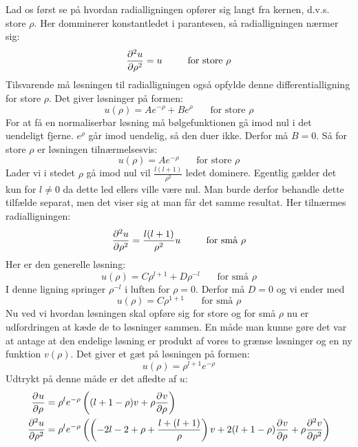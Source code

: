 \documentclass[../../Atom-ogMolekylefysik.tex]{subfiles}
\begin{document}
Lad os først se på hvordan radialligningen opfører sig langt fra kernen, d.v.s. store $\rho$. Her domminerer konstantledet i parantesen, så radialligningen nærmer sig:
\begin{equation}
    \pdif[2]{\rho}{u}=u~~~~~~~~\text{for store $\rho$}
\end{equation}
Tilsvarende må løsningen til radialligningen også opfylde denne differentialligning for store $\rho$. Det giver løsninger på formen:
\begin{equation}
    u(\rho) = Ae^{-\rho}+B e^\rho~~~~~~~~\text{for store $\rho$}
\end{equation}
For at få en normaliserbar løsning må bølgefunktionen gå imod nul i det uendeligt fjerne. $e^\rho$ går imod uendelig, så den duer ikke. Derfor må $B=0$. Så for store $\rho$ er løsningen tilnærmelsesvis:
\begin{equation}
    u(\rho) = Ae^{-\rho}~~~~~~~~\text{for store $\rho$}
\end{equation}
Lader vi i stedet $\rho$ gå imod nul vil $\frac{l(l+1)}{\rho^2}$ ledet dominere. Egentlig gælder det kun for $l\neq0$ da dette led ellers ville være nul. Man burde derfor behandle dette tilfælde separat, men det viser sig at man får det samme resultat. Her tilnærmes radialligningen:
\begin{equation}
    \pdif[2]{\rho}{u}= \frac{l(l+1)}{\rho^2}u~~~~~~~~\text{for små $\rho$}
\end{equation}
Her er den generelle løsning:
$$
u(\rho) = C\rho^{l+1}+D\rho^{-l}~~~~~~~~\text{for små $\rho$}
$$
I denne ligning springer $\rho^{-l}$ i luften for $\rho=0$. Derfor må $D=0$ og vi ender med
\begin{equation}
    u(\rho) = C\rho^{1+1}~~~~~~~~\text{for små $\rho$}
\end{equation}
Nu ved vi hvordan løsningen skal opføre sig for store og for små $\rho$ nu er udfordringen at kæde de to løsninger sammen. En måde man kunne gøre det var at antage at den endelige løsning er produkt af vores to grænse løsninger og en ny funktion $v(\rho)$. Det giver et gæt på løsningen på formen:
\begin{equation}
    u(\rho) = \rho^{l+1}e^{-\rho}
\end{equation}
Udtrykt på denne måde er det afledte af $u$:
\begin{align*}
    \pdif{\rho}{u}&=\rho^le^{-\rho}\left((l+1-\rho)v+\rho\pdif{\rho} v\right)\\
    \pdif[2]{\rho}{u}&=\rho^le^{-\rho}\left(\left(-2l-2+\rho+\frac{l+(l+1)}{\rho}\right)v+2(l+1-\rho)\pdif{\rho}{v}+\rho\pdif[2]{\rho}{v}\right)
\end{align*}
\end{document}
